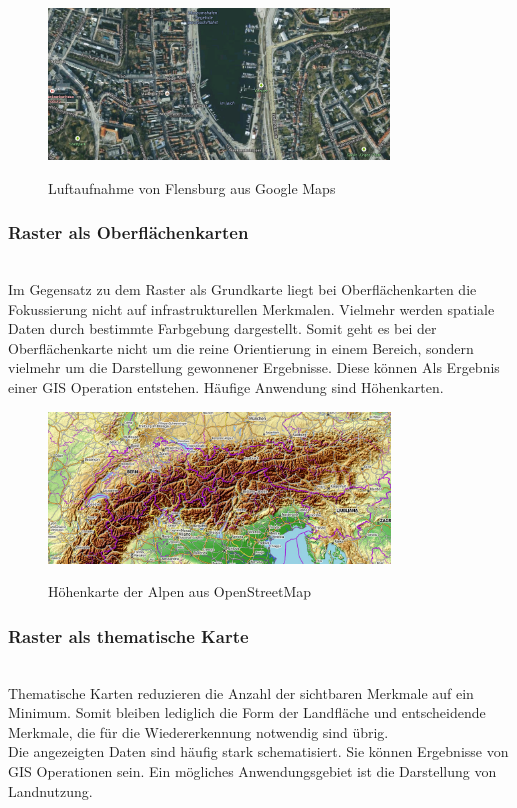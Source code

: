 \documentclass[10pt,conference,compsocconf]{IEEEtran}
\begin{document}
\begin{figure}[H]
  \centering
  	\includegraphics[height=114pt]{img/gis_Flensburg_raster}\\
  \caption[]{Luftaufnahme von Flensburg aus Google Maps}
  \label{img:gis_Flensburg_raster}
\end{figure}

\subsubsection{Raster als Oberflächenkarten}\hspace*{\fill} \\
Im Gegensatz zu dem Raster als Grundkarte liegt bei Oberflächenkarten die Fokussierung nicht auf infrastrukturellen Merkmalen. Vielmehr werden spatiale Daten durch bestimmte Farbgebung dargestellt. Somit geht es bei der Oberflächenkarte nicht um die reine Orientierung in einem Bereich, sondern vielmehr um die Darstellung gewonnener Ergebnisse. Diese können Als Ergebnis einer GIS Operation entstehen. Häufige Anwendung sind Höhenkarten.

\begin{figure}[H]
  \centering
  	\includegraphics[height=114pt]{img/gis_alps}\\
  \caption[]{Höhenkarte der Alpen aus OpenStreetMap}
  \label{img:gis_alps}
\end{figure}

\subsubsection{Raster als thematische Karte}\hspace*{\fill} \\
Thematische Karten reduzieren die Anzahl der sichtbaren Merkmale auf ein Minimum. Somit bleiben lediglich die Form der Landfläche und entscheidende Merkmale, die für die Wiedererkennung notwendig sind übrig.\\
Die angezeigten Daten sind häufig stark schematisiert. Sie können Ergebnisse von GIS Operationen sein. Ein mögliches Anwendungsgebiet ist die Darstellung von Landnutzung. 
\end{document}
